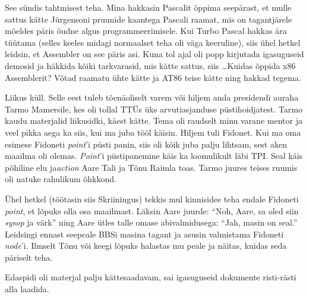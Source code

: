 
See sündis tahtmisest teha. Mina hakkasin  
Pascalit õppima seepärast, et 
mulle sattus kätte Jürgensoni pruunide kaantega Pascali  
raamat, mis on tagantjärele mõeldes 
päris õudne algus programmeerimisele. Kui 
Turbo Pascal hakkas ära tüütama (selles 
keeles midagi normaalset teha oli väga keeruline), siis ühel hetkel 
leidsin, et Assembler on see päris asi. Kuna tol 
ajal oli popp kirjutada igasuguseid demosid ja häkkida kõiki tarkvarasid, mis 
kätte sattus, siis \ldots Kuidas õppida x86 
Assemblerit? Võtad raamatu ühte kätte ja AT86 teise kätte ning hakkad tegema.


Liikus küll. Selle eest tuleb tõenäoliselt varem või hiljem anda
presidendi auraha Tarmo Mamersile, kes oli tollal 
TTÜs üks arvutiasjanduse püstihoidjatest. 
Tarmo kaudu materjalid liikusidki, käest kätte. Tema oli raudselt minu varane 
mentor ja veel pikka aega ka siis, kui ma 
juba tööl käisin. Hiljem tuli 
Fidonet. Kui ma oma esimese Fidoneti \emph{point}'i 
püsti panin, siis oli kõik juba palju lihtsam, sest aken maailma oli
olemas. \emph{Point}'i püstipanemine käis ka loomulikult läbi TPI. Seal käis 
põhiline elu ja\emph{action}   
Aare Tali\label{sisu!aare_tali} ja Tõnu 
Raimla toas. Tarmo juures teises ruumis oli natuke 
rahulikum 
õhkkond. 

Ühel  
hetkel (töötasin siis Skriiningus) tekkis mul kinnisidee teha 
endale Fidoneti \emph{point}, et 
lõpuks olla osa maailmast. Läksin Aare juurde: \enquote{Noh, Aare, 
sa oled siin \emph{sysop} ja värk} ning Aare ütles talle omase abivalmidusega: 
\enquote{Jah, masin on seal.} Leidsingi ennast seepeale BBSi masina tagant ja 
asusin
valmistama Fidoneti \emph{node}'i. Ilmselt Tõnu või keegi 
lõpuks halastas mu peale ja näitas, kuidas seda päriselt teha. 

Edaspidi oli materjal palju kättesaadavam, sai 
igasuguseid dokumente risti-rästi alla laadida. 


